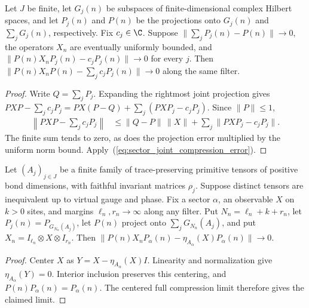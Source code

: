 \begin{lemma}
    \label{thm:sector_observable_decomposition_from_columns}
    \leanok
    Let $J$ be finite, let $G_j(n)$ be subspaces of finite-dimensional complex
    Hilbert spaces, and let $P_j(n)$ and $P(n)$ be the projections onto
    $G_j(n)$ and $\sum_jG_j(n)$, respectively. Fix $c_j\in\C$.
    Suppose $\|\sum_jP_j(n)-P(n)\|\to0$, the operators $X_n$ are eventually
    uniformly bounded, and
    $\|P(n)X_nP_j(n)-c_jP_j(n)\|\to0$ for every $j$.
    Then $\|P(n)X_nP(n)-\sum_jc_jP_j(n)\|\to0$ along the same filter.
\end{lemma}
\begin{proof}
    \leanok
    Write $Q=\sum_jP_j$. Expanding the rightmost joint projection gives
    $PXP-\sum_jc_jP_j=PX(P-Q)+\sum_j(PXP_j-c_jP_j)$.
    Since $\|P\|\le1$,
    \begin{align}
        \label{eq:sector_joint_compression_error}
        \left\|PXP-\sum_jc_jP_j\right\|
         & \le \|Q-P\|\,\|X\|+\sum_j\|PXP_j-c_jP_j\|.
    \end{align}
    The finite sum tends to zero, as does the projection error multiplied
    by the uniform norm bound. Apply~(\ref{eq:sector_joint_compression_error}).
\end{proof}

\begin{lemma}
    \label{thm:multiblock_bulk_observable_column_limit}
    \leanok
    Let $(A_j)_{j\in J}$ be a finite family of trace-preserving primitive
    tensors of positive bond dimensions, with faithful invariant matrices
    $\rho_j$. Suppose distinct tensors are inequivalent up to virtual gauge
    and phase. Fix a sector $\alpha$, an observable $X$ on $k>0$ sites,
    and margins $\ell_n,r_n\to\infty$ along any filter. Put
    $N_n=\ell_n+k+r_n$, let $P_j(n)=P_{G_{N_n}(A_j)}$, let $P(n)$ project
    onto $\sum_jG_{N_n}(A_j)$, and put
    $X_n=I_{\ell_n}\otimes X\otimes I_{r_n}$.
    Then $\|P(n)X_nP_\alpha(n)-\eta_{A_\alpha}(X)P_\alpha(n)\|\to0$.
\end{lemma}
\begin{proof}
    \leanok
    Center $X$ as $Y=X-\eta_{A_\alpha}(X)I$. Linearity and normalization
    give $\eta_{A_\alpha}(Y)=0$. Interior inclusion preserves this
    centering, and $P(n)P_\alpha(n)=P_\alpha(n)$.
    The centered full compression limit therefore gives the claimed limit.
\end{proof}

